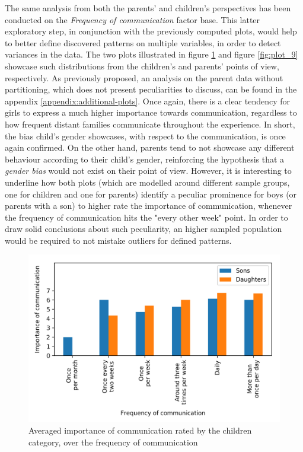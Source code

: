 The same analysis from both the parents' and children's perspectives has been conducted on the \textit{Frequency of communication} factor base. This latter exploratory step, in conjunction with the previously computed plots, would help to better define discovered patterns on multiple variables, in order to detect variances in the data. The two plots illustrated in figure \ref{fig:plot_10} and figure \ref{fig:plot_9} showcase such distributions from the children's and parents' points of view, respectively. As previously proposed, an analysis on the parent data without partitioning, which does not present peculiarities to discuss, can be found in the appendix \ref{appendix:additional-plots}. Once again, there is a clear tendency for girls to express a much higher importance towards communication, regardless to how frequent distant families communicate throughout the experience. In short, the bias child's gender showcases, with respect to the communication, is once again confirmed. On the other hand, parents tend to not showcase any different behaviour according to their child's gender, reinforcing the hypothesis that a \textit{gender bias} would not exist on their point of view. However, it is interesting to underline how both plots (which are modelled around different sample groups, one for children and one for parents) identify a peculiar prominence for boys (or parents with a son) to higher rate the importance of communication, whenever the frequency of communication hits the "every other week" point. In order to draw solid conclusions about such peculiarity, an higher sampled population would be required to not mistake outliers for defined patterns.  

\begin{figure}[ht]
    \centering
    \includegraphics[scale=0.58]{plots/plot_10.png}
    \caption{Averaged importance of communication rated by the children category, over the frequency of communication}
    \label{fig:plot_10}
\end{figure}

